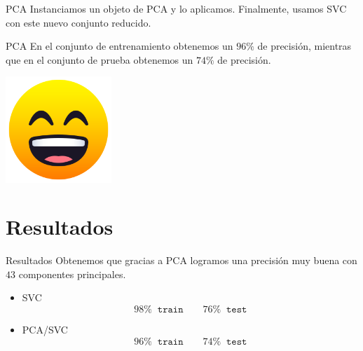 \documentclass[11pt]{beamer}
\begin{document}

\begin{frame}{PCA}
    \justifying
    Instanciamos un objeto de PCA y lo aplicamos.
    \lstI
    Finalmente, usamos SVC con este nuevo conjunto reducido.
\end{frame}

\begin{frame}{PCA}
    \justifying
    En el conjunto de entrenamiento obtenemos un $96\%$ de precisión, mientras que 
    en el conjunto de prueba obtenemos un $74\%$ de precisión.
    \begin{center}
        \includegraphics[width=0.3\textwidth]{imagenes/feliz.png}
    \end{center}
    \end{frame}
	
\section{Resultados}
\begin{frame}{Resultados}
    \justifying
    Obtenemos que gracias a PCA logramos una precisión muy buena con $43$
    componentes principales. 
    \begin{itemize}
        \item SVC 
        \begin{equation*}
            98\% \; \; \texttt{train} \quad \quad 76\% \; \; \texttt{test}
        \end{equation*}

        \item PCA/SVC
        \begin{equation*}
            96\% \; \; \texttt{train} \quad \quad 74\% \; \; \texttt{test}
        \end{equation*}
    \end{itemize}
\end{frame}
\end{document}
